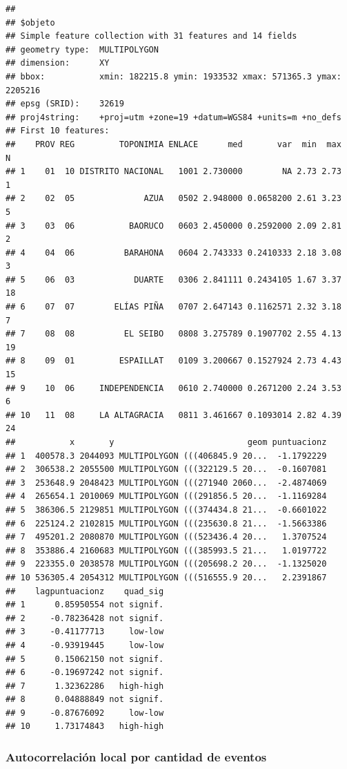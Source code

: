 \documentclass[11pt,]{article}
\begin{document}
\begin{verbatim}
## 
## $objeto
## Simple feature collection with 31 features and 14 fields
## geometry type:  MULTIPOLYGON
## dimension:      XY
## bbox:           xmin: 182215.8 ymin: 1933532 xmax: 571365.3 ymax: 2205216
## epsg (SRID):    32619
## proj4string:    +proj=utm +zone=19 +datum=WGS84 +units=m +no_defs
## First 10 features:
##    PROV REG         TOPONIMIA ENLACE      med       var  min  max  N
## 1    01  10 DISTRITO NACIONAL   1001 2.730000        NA 2.73 2.73  1
## 2    02  05              AZUA   0502 2.948000 0.0658200 2.61 3.23  5
## 3    03  06           BAORUCO   0603 2.450000 0.2592000 2.09 2.81  2
## 4    04  06          BARAHONA   0604 2.743333 0.2410333 2.18 3.08  3
## 5    06  03            DUARTE   0306 2.841111 0.2434105 1.67 3.37 18
## 6    07  07        ELÍAS PIÑA   0707 2.647143 0.1162571 2.32 3.18  7
## 7    08  08          EL SEIBO   0808 3.275789 0.1907702 2.55 4.13 19
## 8    09  01         ESPAILLAT   0109 3.200667 0.1527924 2.73 4.43 15
## 9    10  06     INDEPENDENCIA   0610 2.740000 0.2671200 2.24 3.53  6
## 10   11  08     LA ALTAGRACIA   0811 3.461667 0.1093014 2.82 4.39 24
##           x       y                           geom puntuacionz
## 1  400578.3 2044093 MULTIPOLYGON (((406845.9 20...  -1.1792229
## 2  306538.2 2055500 MULTIPOLYGON (((322129.5 20...  -0.1607081
## 3  253648.9 2048423 MULTIPOLYGON (((271940 2060...  -2.4874069
## 4  265654.1 2010069 MULTIPOLYGON (((291856.5 20...  -1.1169284
## 5  386306.5 2129851 MULTIPOLYGON (((374434.8 21...  -0.6601022
## 6  225124.2 2102815 MULTIPOLYGON (((235630.8 21...  -1.5663386
## 7  495201.2 2080870 MULTIPOLYGON (((523436.4 20...   1.3707524
## 8  353886.4 2160683 MULTIPOLYGON (((385993.5 21...   1.0197722
## 9  223355.0 2038578 MULTIPOLYGON (((205698.2 20...  -1.1325020
## 10 536305.4 2054312 MULTIPOLYGON (((516555.9 20...   2.2391867
##    lagpuntuacionz    quad_sig
## 1      0.85950554 not signif.
## 2     -0.78236428 not signif.
## 3     -0.41177713     low-low
## 4     -0.93919445     low-low
## 5      0.15062150 not signif.
## 6     -0.19697242 not signif.
## 7      1.32362286   high-high
## 8      0.04888849 not signif.
## 9     -0.87676092     low-low
## 10     1.73174843   high-high
\end{verbatim}

\subsubsection{Autocorrelación local por cantidad de
eventos}\label{autocorrelaciuxf3n-local-por-cantidad-de-eventos-1}
\end{document}
